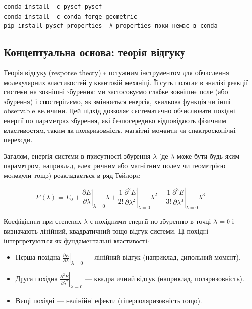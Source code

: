 \begin{verbatim}
conda install -c pyscf pyscf
conda install -c conda-forge geometric
pip install pyscf-properties  # properties поки немає в conda
\end{verbatim}

\subsection*{Концептуальна основа: теорія відгуку}

Теорія відгуку (response theory) є потужним інструментом для обчислення молекулярних властивостей у квантовій механіці. Її суть полягає в аналізі реакції системи на зовнішні збурення: ми застосовуємо слабке зовнішнє поле (або збурення) і спостерігаємо, як змінюється енергія, хвильова функція чи інші observable величини. Цей підхід дозволяє систематично обчислювати похідні енергії по параметрах збурення, які безпосередньо відповідають фізичним властивостям, таким як поляризовність, магнітні моменти чи спектроскопічні переходи.

Загалом, енергія системи в присутності збурення $\lambda$ (де $\lambda$ може бути будь-яким параметром, наприклад, електричним або магнітним полем чи геометрією молекули тощо) розкладається в ряд Тейлора:

\[
E(\lambda) = E_0 + \left. \frac{\partial E}{\partial \lambda} \right|_{\lambda=0} \lambda + \frac{1}{2!} \left. \frac{\partial^2 E}{\partial \lambda^2} \right|_{\lambda=0} \lambda^2 + \frac{1}{3!} \left. \frac{\partial^3 E}{\partial \lambda^3} \right|_{\lambda=0} \lambda^3 + \ldots
\]

Коефіцієнти при степенях $\lambda$ є похідними енергії по збуренню в точці $\lambda=0$ і визначають лінійний, квадратичний тощо відгук системи. Ці похідні інтерпретуються як фундаментальні властивості:

\begin{itemize}
    \item Перша похідна $\left. \frac{\partial E}{\partial \lambda} \right|_{\lambda=0}$ --- лінійний відгук (наприклад, дипольний момент).
    \item Друга похідна $\left. \frac{\partial^2 E}{\partial \lambda^2} \right|_{\lambda=0}$ --- квадратичний відгук (наприклад, поляризовність).
    \item Вищі похідні --- нелінійні ефекти (гіперполяризовність тощо).
\end{itemize}

